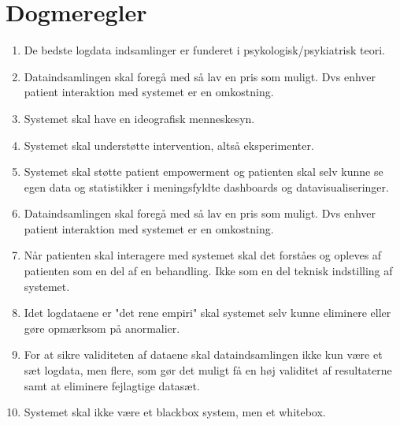\chapter{Dogmeregler}\label{app:dogmeregler}
\begin{enumerate}
	\item De bedste logdata indsamlinger er funderet i psykologisk/psykiatrisk teori.
	\item Dataindsamlingen skal foregå med så lav en pris som muligt. Dvs enhver patient interaktion med systemet er en omkostning.
	\item Systemet skal have en ideografisk menneskesyn.
	\item Systemet skal understøtte intervention, altså eksperimenter.
	\item Systemet skal støtte patient empowerment og patienten skal selv kunne se egen data og statistikker i meningsfyldte dashboards og datavisualiseringer.
	\item Dataindsamlingen skal foregå med så lav en pris som muligt. Dvs enhver patient interaktion med systemet er en omkostning.
	\item Når patienten skal interagere med systemet skal det forståes og opleves af patienten som en del af en behandling. Ikke som en del teknisk indstilling af systemet.
	\item Idet logdataene er "det rene empiri" skal systemet selv kunne eliminere eller gøre opmærksom på anormalier.
	\item For at sikre validiteten af dataene skal dataindsamlingen ikke kun være et sæt logdata, men flere, som gør det muligt få en høj validitet af resultaterne samt at eliminere fejlagtige datasæt.
	\item Systemet skal ikke være et blackbox system, men et whitebox.
\end{enumerate}